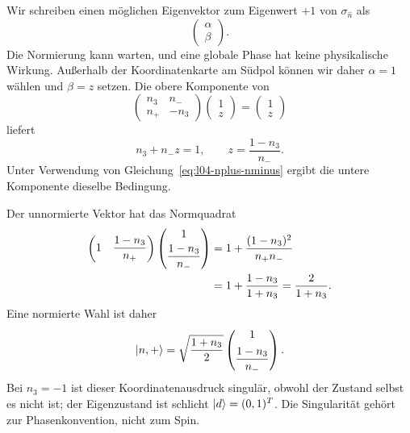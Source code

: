 Wir schreiben einen möglichen Eigenvektor zum Eigenwert \(+1\) von \(\sigma_{\hat n}\) als
\begin{equation}
  \begin{pmatrix}\alpha\\\beta\end{pmatrix}.
\end{equation}
Die Normierung kann warten, und eine globale Phase hat keine physikalische Wirkung. Außerhalb der Koordinatenkarte am Südpol können wir daher \(\alpha=1\) wählen und \(\beta=z\) setzen. Die obere Komponente von
\begin{equation}
  \begin{pmatrix}
    n_3&n_-\\
    n_+&-n_3
  \end{pmatrix}
  \begin{pmatrix}1\\z\end{pmatrix}
  =
  \begin{pmatrix}1\\z\end{pmatrix}
\end{equation}
liefert
\begin{equation}
  n_3+n_-z=1,
  \qquad
  z=\frac{1-n_3}{n_-}.
  \label{eq:l04-z-solution}
\end{equation}
Unter Verwendung von Gleichung~\eqref{eq:l04-nplus-nminus} ergibt die untere Komponente dieselbe Bedingung.

Der unnormierte Vektor hat das Normquadrat
\begin{align}
  \begin{pmatrix}
    1&\dfrac{1-n_3}{n_+}
  \end{pmatrix}
  \begin{pmatrix}
    1\\[3pt]\dfrac{1-n_3}{n_-}
  \end{pmatrix}
  &=
  1+\frac{(1-n_3)^2}{n_+n_-}
  \notag\\
  &=
  1+\frac{1-n_3}{1+n_3}
  =
  \frac{2}{1+n_3}.
  \label{eq:l04-unnormalized-norm}
\end{align}
Eine normierte Wahl ist daher
\begin{equation}
  \left\lvert n,+\right\rangle
  =
  \sqrt{\frac{1+n_3}{2}}
  \begin{pmatrix}
    1\\[5pt]\dfrac{1-n_3}{n_-}
  \end{pmatrix}.
  \label{eq:l04-normalized-n-state}
\end{equation}
Bei \(n_3=-1\) ist dieser Koordinatenausdruck singulär, obwohl der Zustand selbst es nicht ist; der Eigenzustand ist schlicht \(\left\lvert d\right\rangle=(0,1)^T\). Die Singularität gehört zur Phasenkonvention, nicht zum Spin.

